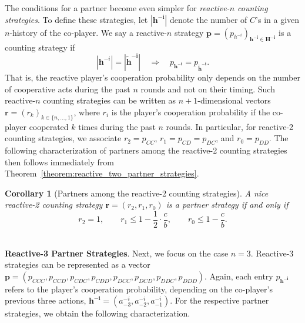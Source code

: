 \documentclass[11pt]{article}
\theoremstyle{plainCl1}
\newtheorem{corollary}{Corollary}
\theoremstyle{plainCl2}
\begin{document}
The conditions for a partner become even simpler for {\it reactive-$n$ counting strategies}. To define these strategies, let $|\mathbf{h^{-i}}|$ denote the number of $C$'s in a given $n$-history of the co-player. We say a reactive-$n$ strategy $\mathbf{p}\!=\!(p_{h^{-i}})_{\mathbf{h^{-i}\in H^{-i}}}$ is a counting strategy if 
\begin{equation}
|\mathbf{h}^{-i}|\! =\! |\mathbf{\tilde h^{-i}}| \quad \Rightarrow \quad p_\mathbf{h^{-i}} = p_\mathbf{\tilde h^{-i}}. 
\end{equation} 
That is, the reactive player's cooperation probability only depends on the number of cooperative acts during the past $n$ rounds and not on their timing. 
Such reactive-$n$ counting strategies can be written as $n\!+\!1$-dimensional vectors $\mathbf{r}\!=\!(r_k)_{k\in\{n,\ldots,1\}}$, where $r_i$ is the player's cooperation probability if the co-player cooperated $k$ times during the past $n$ rounds. In particular, for reactive-2 counting strategies, we associate $r_2\!=\!p_{CC}$, $r_1\!=\!p_{CD}\!=\!p_{DC}$, and $r_0\!=\!p_{DD}$. 
The following characterization of partners among the reactive-2 counting strategies then follows immediately from Theorem~\ref{theorem:reactive_two_partner_strategies}. 

\begin{corollary}[Partners among the reactive-2 counting strategies]
\label{Cor:PartnersCountingTwo} 
A nice reactive-2 counting strategy $\mathbf{r} = (r_2, r_1, r_0)$ is a partner strategy if and only if
\begin{equation}\label{eq:counting_two_bit_conditions}
 r_2 \!=\! 1, \qquad r_1 \!\le\! 1\!-\!\frac{1}{2} \cdot \frac{c}{b}, \qquad r_0 \!\le\! 1\!-\! \frac{c}{b}.
\end{equation}
\end{corollary}
 ~\\


\noindent
{\bf Reactive-3 Partner Strategies}.
Next, we focus on the case $n\!=\!3$. Reactive-3 strategies can be represented as a vector 
$\mathbf{p}=(p_{CCC}, p_{CCD}, p_{CDC}, p_{CDD}, p_{DCC}, p_{DCD}, p_{DDC}, p_{DDD})$.
Again, each entry $p_\mathbf{h^{-i}}$ refers to the player's cooperation probability, depending on the co-player's previous three actions, $\mathbf{h^{-i}}\!=\!(a^{-i}_{-3}, a^{-i}_{-2}, a^{-i}_{-1})$.
For the respective partner strategies, we obtain the following characterization. 
\end{document}

